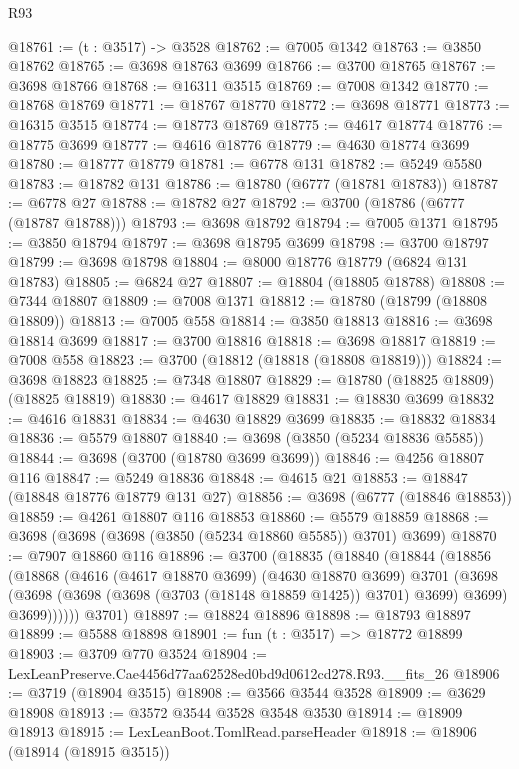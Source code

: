 \begin{lexlean}{R93}
\begin{coremodule}
@18761 := (t : @3517) -> @3528
@18762 := @7005 @1342
@18763 := @3850 @18762
@18765 := @3698 @18763 @3699
@18766 := @3700 @18765
@18767 := @3698 @18766
@18768 := @16311 @3515
@18769 := @7008 @1342
@18770 := @18768 @18769
@18771 := @18767 @18770
@18772 := @3698 @18771
@18773 := @16315 @3515
@18774 := @18773 @18769
@18775 := @4617 @18774
@18776 := @18775 @3699
@18777 := @4616 @18776
@18779 := @4630 @18774 @3699
@18780 := @18777 @18779
@18781 := @6778 @131
@18782 := @5249 @5580
@18783 := @18782 @131
@18786 := @18780 (@6777 (@18781 @18783))
@18787 := @6778 @27
@18788 := @18782 @27
@18792 := @3700 (@18786 (@6777 (@18787 @18788)))
@18793 := @3698 @18792
@18794 := @7005 @1371
@18795 := @3850 @18794
@18797 := @3698 @18795 @3699
@18798 := @3700 @18797
@18799 := @3698 @18798
@18804 := @8000 @18776 @18779 (@6824 @131 @18783)
@18805 := @6824 @27
@18807 := @18804 (@18805 @18788)
@18808 := @7344 @18807
@18809 := @7008 @1371
@18812 := @18780 (@18799 (@18808 @18809))
@18813 := @7005 @558
@18814 := @3850 @18813
@18816 := @3698 @18814 @3699
@18817 := @3700 @18816
@18818 := @3698 @18817
@18819 := @7008 @558
@18823 := @3700 (@18812 (@18818 (@18808 @18819)))
@18824 := @3698 @18823
@18825 := @7348 @18807
@18829 := @18780 (@18825 @18809) (@18825 @18819)
@18830 := @4617 @18829
@18831 := @18830 @3699
@18832 := @4616 @18831
@18834 := @4630 @18829 @3699
@18835 := @18832 @18834
@18836 := @5579 @18807
@18840 := @3698 (@3850 (@5234 @18836 @5585))
@18844 := @3698 (@3700 (@18780 @3699 @3699))
@18846 := @4256 @18807 @116
@18847 := @5249 @18836
@18848 := @4615 @21
@18853 := @18847 (@18848 @18776 @18779 @131 @27)
@18856 := @3698 (@6777 (@18846 @18853))
@18859 := @4261 @18807 @116 @18853
@18860 := @5579 @18859
@18868 := @3698 (@3698 (@3698 (@3850 (@5234 @18860 @5585)) @3701) @3699)
@18870 := @7907 @18860 @116
@18896 := @3700
    (@18835
      (@18840
        (@18844
          (@18856
            (@18868
              (@4616
                (@4617 @18870 @3699)
                (@4630 @18870 @3699)
                @3701
                (@3698
                  (@3698 (@3698 (@3698 (@3703 (@18148 @18859 @1425)) @3701) @3699) @3699)
                  @3699))))))
      @3701)
@18897 := @18824 @18896
@18898 := @18793 @18897
@18899 := @5588 @18898
@18901 := fun (t : @3517) => @18772 @18899
@18903 := @3709 @770 @3524
@18904 := LexLeanPreserve.Cae4456d77aa62528ed0bd9d0612cd278.R93.__fits_26
@18906 := @3719 (@18904 @3515)
@18908 := @3566 @3544 @3528
@18909 := @3629 @18908
@18913 := @3572 @3544 @3528 @3548 @3530
@18914 := @18909 @18913
@18915 := LexLeanBoot.TomlRead.parseHeader
@18918 := @18906 (@18914 (@18915 @3515))

\end{coremodule}
\end{lexlean}
